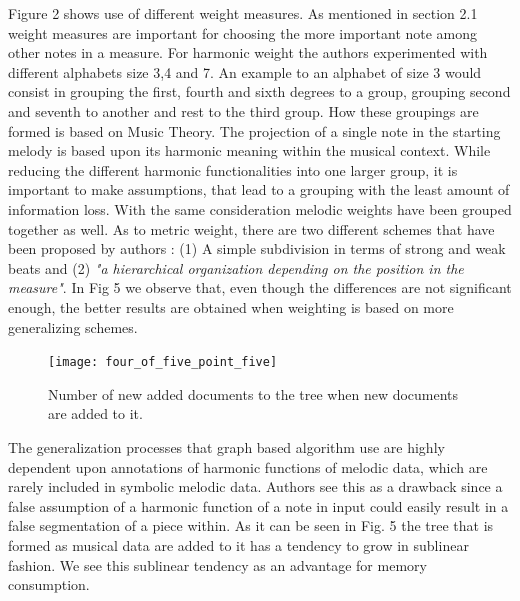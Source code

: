 \documentclass{llncs}
\begin{document}
\begin{itemize}
			Figure 2 shows use of different weight measures. As mentioned in section 2.1 weight measures are important for choosing the more important note among other notes in a measure. For harmonic weight the authors experimented with different alphabets size 3,4 and 7. An example to an alphabet of size 3 would consist in grouping the first, fourth and sixth degrees to a group, grouping second and seventh to another and rest to the third group. How these groupings are formed is based on Music Theory. The projection of a single note in the starting melody is based upon its harmonic meaning within the musical context. While reducing the different harmonic functionalities into one larger group, it is important to make assumptions, that lead to a grouping with the least amount of information loss. With the same consideration melodic weights have  been grouped together as well. As to metric weight, there are two different schemes that have been proposed by authors : (1) A simple subdivision in terms of strong and weak beats and (2) \textit{"a hierarchical organization depending on the position in the measure"}. In Fig 5 we observe that, even though the differences are not significant enough, the better results are obtained when weighting is based on more generalizing schemes.
			
			\begin{figure}[h!]
			\centering
            \texttt{[image: four\_of\_five\_point\_five]}
			\caption{Number of new added documents to the tree when new documents are added to it. \cite{five_point_five}}
        	\end{figure}

			The generalization processes that graph based algorithm use are highly dependent upon annotations of harmonic functions of melodic data, which are rarely included in symbolic melodic data. Authors see this as a drawback since a false assumption of a harmonic function of a note in input could easily result in a false segmentation of a piece within. As it can be seen in Fig. 5 the tree that is formed as musical data are added to it has a tendency to grow in sublinear fashion. We see this sublinear tendency as an advantage for memory consumption.


\end{itemize}
\end{document}
